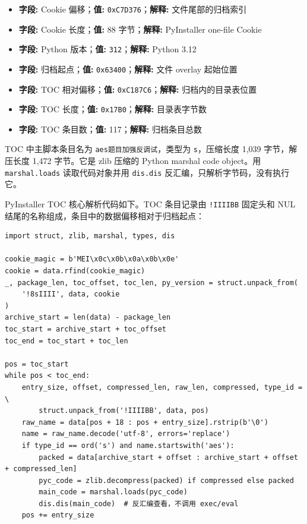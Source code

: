 \begin{itemize}
\tightlist
\item
  \textbf{字段:} Cookie 偏移；\textbf{值:} \texttt{0xC7D376}；\textbf{解释:} 文件尾部的归档索引
\item
  \textbf{字段:} Cookie 长度；\textbf{值:} 88 字节；\textbf{解释:} PyInstaller one-file Cookie
\item
  \textbf{字段:} Python 版本；\textbf{值:} \texttt{312}；\textbf{解释:} Python 3.12
\item
  \textbf{字段:} 归档起点；\textbf{值:} \texttt{0x63400}；\textbf{解释:} 文件 overlay 起始位置
\item
  \textbf{字段:} TOC 相对偏移；\textbf{值:} \texttt{0xC187C6}；\textbf{解释:} 归档内的目录表位置
\item
  \textbf{字段:} TOC 长度；\textbf{值:} \texttt{0x17B0}；\textbf{解释:} 目录表字节数
\item
  \textbf{字段:} TOC 条目数；\textbf{值:} 117；\textbf{解释:} 归档条目总数
\end{itemize}

TOC 中主脚本条目名为 \texttt{aes题目加强反调试}，类型为 \texttt{s}，压缩长度 1,039 字节，解压长度 1,472 字节。它是 zlib 压缩的 Python marshal code object。用 \texttt{marshal.loads} 读取代码对象并用 \texttt{dis.dis} 反汇编，只解析字节码，没有执行它。

PyInstaller TOC 核心解析代码如下。TOC 条目记录由 \texttt{!IIIIBB} 固定头和 NUL 结尾的名称组成，条目中的数据偏移相对于归档起点：

\begin{verbatim}
import struct, zlib, marshal, types, dis

cookie_magic = b'MEI\x0c\x0b\x0a\x0b\x0e'
cookie = data.rfind(cookie_magic)
_, package_len, toc_offset, toc_len, py_version = struct.unpack_from(
    '!8sIIII', data, cookie
)
archive_start = len(data) - package_len
toc_start = archive_start + toc_offset
toc_end = toc_start + toc_len

pos = toc_start
while pos < toc_end:
    entry_size, offset, compressed_len, raw_len, compressed, type_id = \
        struct.unpack_from('!IIIIBB', data, pos)
    raw_name = data[pos + 18 : pos + entry_size].rstrip(b'\0')
    name = raw_name.decode('utf-8', errors='replace')
    if type_id == ord('s') and name.startswith('aes'):
        packed = data[archive_start + offset : archive_start + offset + compressed_len]
        pyc_code = zlib.decompress(packed) if compressed else packed
        main_code = marshal.loads(pyc_code)
        dis.dis(main_code)  # 反汇编查看，不调用 exec/eval
    pos += entry_size
\end{verbatim}

